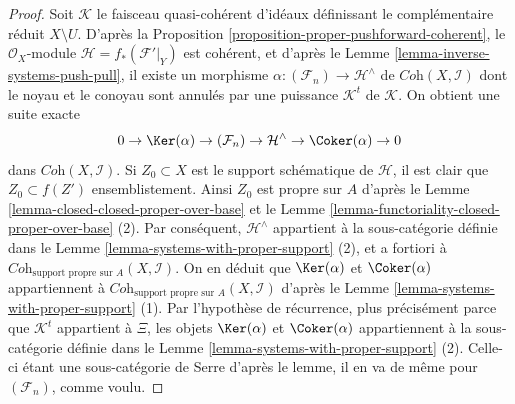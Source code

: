 \begin{proof}
\medskip\noindent
Soit $\mathcal{K}$ le faisceau quasi-cohérent d'idéaux définissant
le complémentaire réduit $X \setminus U$. D'après la
Proposition \ref{proposition-proper-pushforward-coherent},
le $\mathcal{O}_X$-module $\mathcal{H} = f_*(\mathcal{F}'|_Y)$ est cohérent,
et d'après le Lemme \ref{lemma-inverse-systems-push-pull},
il existe un morphisme $\alpha : (\mathcal{F}_n) \to \mathcal{H}^\wedge$
de $\textit{Coh}(X, \mathcal{I})$ dont le noyau et le conoyau sont
annulés par une puissance $\mathcal{K}^t$ de $\mathcal{K}$.
On obtient une suite exacte
$$
0 \to \Ker(\alpha) \to (\mathcal{F}_n) \to
\mathcal{H}^\wedge \to \Coker(\alpha) \to 0
$$
dans $\textit{Coh}(X, \mathcal{I})$. Si $Z_0 \subset X$ est le support
schématique de $\mathcal{H}$, il est clair que $Z_0 \subset f(Z')$
ensemblistement. Ainsi $Z_0$ est propre sur $A$ d'après le
Lemme \ref{lemma-closed-closed-proper-over-base} et le
Lemme \ref{lemma-functoriality-closed-proper-over-base} (2).
Par conséquent, $\mathcal{H}^\wedge$ appartient à la sous-catégorie définie dans le
Lemme \ref{lemma-systems-with-proper-support} (2),
et a fortiori à
$\textit{Coh}_{\text{support propre sur }A}(X, \mathcal{I})$.
On en déduit que $\Ker(\alpha)$ et $\Coker(\alpha)$
appartiennent à $\textit{Coh}_{\text{support propre sur }A}(X, \mathcal{I})$
d'après le Lemme \ref{lemma-systems-with-proper-support} (1).
Par l'hypothèse de récurrence, plus précisément parce que $\mathcal{K}^t$ appartient à $\Xi$,
les objets $\Ker(\alpha)$ et $\Coker(\alpha)$ appartiennent à
la sous-catégorie définie dans le
Lemme \ref{lemma-systems-with-proper-support} (2).
Celle-ci étant une sous-catégorie de Serre d'après le lemme, il en va
de même pour $(\mathcal{F}_n)$, comme voulu.
\end{proof}

